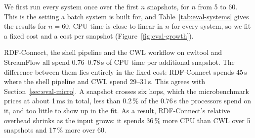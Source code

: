 We first run every system once over the first $n$ snapshots, for $n$ from 5 to
60. This is the setting a batch system is built for, and
Table~\ref{tab:eval-systems} gives the results for $n = 60$. CPU time is close
to linear in $n$ for every system, so we fit a fixed cost and a cost per
snapshot (Figure~\ref{fig:eval-growth}).

\begin{table}[t]
\caption{One run over 60 snapshots: elapsed time, CPU time, mean cores in use,
peak memory and peak intermediate storage, and the fixed and per-snapshot CPU
cost fitted over runs of 5 to 60 snapshots. Medians of five runs.}
\label{tab:eval-systems}
\setlength{\tabcolsep}{3pt}
\end{table}

RDF-Connect, the shell pipeline and the CWL workflow on cwltool and StreamFlow
all spend 0.76--0.78\,s of CPU time per additional snapshot. The difference
between them lies entirely in the fixed cost: RDF-Connect spends 45\,s where the
shell pipeline and CWL spend 29--31\,s. This agrees with
Section~\ref{sec:eval-micro}. A snapshot crosses six hops, which the
microbenchmark prices at about 1\,ms in total, less than 0.2\,\% of the
0.76\,s the processors spend on it, and too little to show up in the fit.
 As a result, RDF-Connect's
relative overhead shrinks as the input grows: it spends 36\,\% more CPU than
CWL over 5 snapshots and 17\,\% more over 60.

